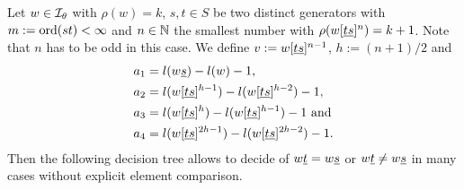 \begin{prop}
	Let $w \in \mathcal{I}_{\theta}$ with $\rho(w) = k$, $s,t \in S$ be two distinct generators with $m := \operatorname{ord}(st) < \infty$ and $n \in \mathbb{N}$ the smallest number with $\rho(w[\underline{t} \underline{s}]^n) = k+1$. Note that $n$ has to be odd in this case. We define $v := w[\underline{t} \underline{s}]^{n-1}$, $h := (n+1)/2$ and
	\begin{align*}
		a_1 & = l(w \underline{s}) - l(w) - 1, \\
		a_2 & = l(w[\underline{t} \underline{s}]^{h-1}) - l(w[\underline{t} \underline{s}]^{h-2}) - 1, \\
		a_3 & = l(w[\underline{t} \underline{s}]^{h}) - l(w[\underline{t} \underline{s}]^{h-1}) - 1 \textrm{ and} \\
		a_4 & = l(w[\underline{t} \underline{s}]^{2h-1}) - l(w[\underline{t} \underline{s}]^{2h-2}) - 1.
	\end{align*}
	Then the following decision tree allows to decide of $w \underline{t} = w \underline{s}$ or $w \underline{t} \neq w \underline{s}$ in many cases without explicit element comparison.


\end{prop}
